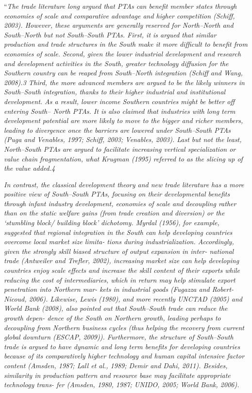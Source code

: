 ``\emph{The trade literature long argued that PTAs can benefit member
states through economies of scale and comparative advantage and higher
competition (Schiff, 2003). However, these arguments are generally
reserved for North--North and South--North but not South--South PTAs.
First, it is argued that similar production and trade structures in the
South make it more difficult to benefit from economies of scale. Second,
given the lower industrial development and research and development
activities in the South, greater technology diffusion for the Southern
country can be reaped from South--North integration (Schiff and Wang,
2008).3 Third, the more advanced members are argued to be the likely
winners in South--South integration, thanks to their higher industrial
and institutional development. As a result, lower income Southern
countries might be better off entering South-- North PTAs. It is also
claimed that industries with long term development potential are more
likely to move to the bigger and richer members, leading to divergence
once the barriers are lowered under South--South PTAs (Puga and
Venables, 1997; Schiff, 2003; Venables, 2003). Last but not the least,
North--South PTAs are argued to facilitate increasing vertical
specialization or value chain fragmentation, what Krugman (1995)
referred to as the slicing up of the value added.4}

\emph{In contrast, the classical development theory and new trade
literature has a more positive view of South--South PTAs, focusing on
their developmental benefits through infant industry development,
economies of scale and decoupling rather than on the static welfare
gains (from trade creation and diversion) or the `stumbling block/
building block' dichotomy. Myrdal (1956), for example, suggested that
regional integration in the South can help developing countries overcome
local market size limita- tions during industrialization. Accordingly,
given the strongly skill biased structure of output expansion in inter-
national trade (Antweiler and Trefler, 2002), increasing market size can
help developing countries enjoy scale effects and increase the skill
content of their exports while reducing the cost of intermediaries,
which in return may help stimulate export penetration into Northern mar-
kets in industrial goods (Fugazza and Robert-Nicoud, 2006). Likewise,
Lewis (1980), and more recently UNCTAD (2005) and World Bank (2008),
also pointed out that South--South trade can reduce the growth depen-
dence of the South on Northern growth, leading perhaps to decoupling
from Northern business cycles (thus helping the recovery from current
global downturn (ESCAP, 2009)). Furthermore, the structure of
South--South trade is argued to have dynamic and long term benefits for
developing countries because of its comparatively higher technology and
human capital intensive factor content (Amsden, 1987; Lall et al., 1989;
Demir and Dahi, 2011). Besides, similarity in production pattern and
resource base may facilitate appropriate technology trans- fer (Amsden,
1980, 1987; UNIDO, 2005; World Bank, 2006).}

